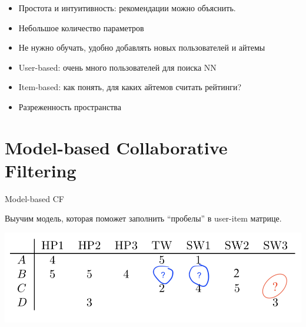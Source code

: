 \documentclass[11pt,aspectratio=169,handout=true]{beamer}
\begin{document}
\begin{frame}{}

\begin{tcolorbox}[colback=info!5,colframe=info!80,title=Плюсы]
  \begin{itemize}
    \item Простота и интуитивность: рекомендации можно объяснить.
    \item Небольшое количество параметров
    \item Не нужно обучать, удобно добавлять новых пользователей и айтемы
  \end{itemize}
\end{tcolorbox}

\begin{tcolorbox}[colback=warn!5,colframe=warn!80,title=Минусы]
  \begin{itemize}
    \item User-based: очень много пользователей для поиска NN
    \item Item-based: как понять, для каких айтемов считать рейтинги?
    \item Разреженность пространства
  \end{itemize}
\end{tcolorbox}

\end{frame}

\section{Model-based Collaborative Filtering}

\begin{frame}{Model-based CF}

\begin{tcolorbox}[colback=info!5,colframe=info!80,title=Идея]
Выучим модель, которая поможет заполнить ``пробелы'' в user-item матрице.
\end{tcolorbox}

\begin{center}
\includegraphics[scale=0.5]{images/utility-2.png}
\end{center}

\end{frame}
\end{document}
